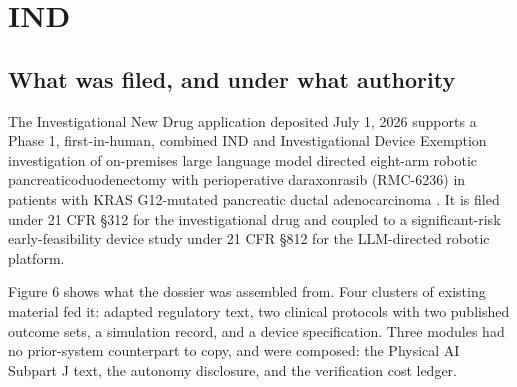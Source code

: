 \section{IND}
\label{sec:ind}

\subsection{What was filed, and under what authority}

The Investigational New Drug application deposited July 1, 2026 supports a Phase
1, first-in-human, combined IND and Investigational Device Exemption
investigation of on-premises large language model directed eight-arm robotic
pancreaticoduodenectomy with perioperative daraxonrasib (RMC-6236) in patients
with KRAS G12-mutated pancreatic ductal adenocarcinoma \cite{phase1ind}. It is
filed under 21 CFR \S 312 for the investigational drug and coupled to a
significant-risk early-feasibility device study under 21 CFR \S 812 for the
LLM-directed robotic platform.



Figure 6 shows what the dossier was assembled from. Four clusters of existing
material fed it: adapted regulatory text, two clinical protocols with two
published outcome sets, a simulation record, and a device specification. Three
modules had no prior-system counterpart to copy, and were composed: the Physical AI
Subpart J text, the autonomy disclosure, and the verification cost ledger.

